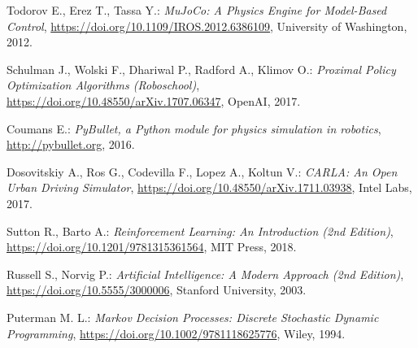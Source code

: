 \begin{thebibliography}{99}
	Todorov E., Erez T., Tassa Y.:
	\emph{MuJoCo: A Physics Engine for Model-Based Control},
	\url{https://doi.org/10.1109/IROS.2012.6386109},
	University of Washington, 2012.

	Schulman J., Wolski F., Dhariwal P., Radford A., Klimov O.:
	\emph{Proximal Policy Optimization Algorithms (Roboschool)},
	\url{https://doi.org/10.48550/arXiv.1707.06347},
	OpenAI, 2017.

	Coumans E.:
	\emph{PyBullet, a Python module for physics simulation in robotics},
	\url{http://pybullet.org},
	2016.

	Dosovitskiy A., Ros G., Codevilla F., Lopez A., Koltun V.:
	\emph{CARLA: An Open Urban Driving Simulator},
	\url{https://doi.org/10.48550/arXiv.1711.03938},
	Intel Labs, 2017.

	Sutton R., Barto A.:
	\emph{Reinforcement Learning: An Introduction (2nd Edition)},
	\url{https://doi.org/10.1201/9781315361564},
	MIT Press, 2018.

	Russell S., Norvig P.:
	\emph{Artificial Intelligence: A Modern Approach (2nd Edition)},
	\url{https://doi.org/10.5555/3000006},
	Stanford University, 2003.

	Puterman M. L.:
	\emph{Markov Decision Processes: Discrete Stochastic Dynamic Programming},
	\url{https://doi.org/10.1002/9781118625776},
	Wiley, 1994.
\end{thebibliography}
